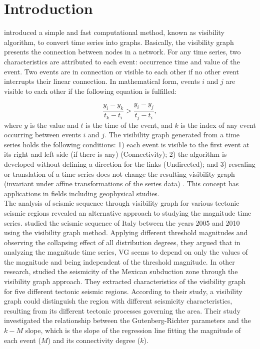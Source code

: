 \section{Introduction}
\noindent
\citet{Lacasa2008} introduced a simple and fast computational method, known as visibility algorithm, to convert time series into graphs. Basically, the visibility graph presents the connection between nodes in a network. For any time series, two characteristics are attributed to each event: occurrence time and value of the event. Two events are in connection or visible to each other if no other event interrupts their linear connection. In mathematical form, events $i$ and $j$ are visible to each other if the following equation is fulfilled:

\begin{equation}
\frac{y_i - y_k }{t_k - t_i} > \frac{y_i - y_j}{ t_j - t_i} ,
\end{equation}
\noindent
where $y$ is the value and $t$ is the time of the event, and $k$ is the index of any event occurring between events  $i$  and  $j$. The visibility graph generated from a time series holds the following conditions: 1) each event is visible to the first event at its right and left side (if there is any) (Connectivity); 2) the algorithm is developed without defining a direction for the links (Undirected); and 3) rescaling or translation of a time series does not change the resulting visibility graph (invariant under affine transformations of the series data) \citep{Lacasa2008}. This concept has applications in fields including geophysical studies. \\
\noindent
The analysis of seismic sequence through visibility graph for various tectonic seismic regions revealed an alternative approach to studying the magnitude time series.  \citet{Telesca2012} studied the seismic sequence of Italy between the years 2005 and 2010 using the visibility graph method. Applying different threshold magnitudes and observing the collapsing effect of all distribution degrees, they argued that in analyzing the magnitude time series, VG seems to depend on only the values of the magnitude and being independent of the threshold magnitude. 
\noindent
In other research, \citet{Telesca2013} studied the seismicity of the Mexican subduction zone through the visibility graph approach. They extracted characteristics of the visibility graph for five different tectonic seismic regions.  According to their study, a visibility graph could distinguish the region with different seismicity characteristics, resulting from its different tectonic processes governing the area. Their study investigated the relationship between the Gutenberg-Richter parameters and the $k-M$ slope, which is the slope of the regression line fitting the magnitude of each event  ($M$) and its connectivity degree  ($k$). 
